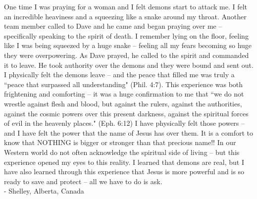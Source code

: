 \documentclass[twoside, 12pt]{book}
\begin{document}
One time I was praying for a woman and I felt demons start to attack me. I felt an incredible heaviness and a squeezing like a snake around my throat. Another team member called to Dave and he came and began praying over me -- specifically speaking to the spirit of death. I remember lying on the floor, feeling like I was being squeezed by a huge snake -- feeling all my fears becoming so huge they were overpowering. As Dave prayed, he called to the spirit and commanded it to leave. He took authority over the demons and they were bound and sent out. I physically felt the demons leave -- and the peace that filled me was truly a ``peace that surpassed all understanding" (Phil. 4:7).
This experience was both frightening and comforting -- it was a huge confirmation to me that ``we do not wrestle against flesh and blood, but against the rulers, against the authorities, against the cosmic powers over this present darkness, against the spiritual forces of evil in the heavenly places." (Eph. 6:12)  I have physically felt those powers -- and I have felt the power that the name of Jesus has over them. It is a comfort to know that NOTHING is bigger or stronger than that precious name!!
In our Western world do not often acknowledge the spiritual side of living -- but this experience opened my eyes to this reality. I learned that demons are real, but I have also learned through this experience that Jesus is more powerful and is so ready to save and protect -- all we have to do is ask. \\

- Shelley, Alberta, Canada
\clearpage

\end{document}
